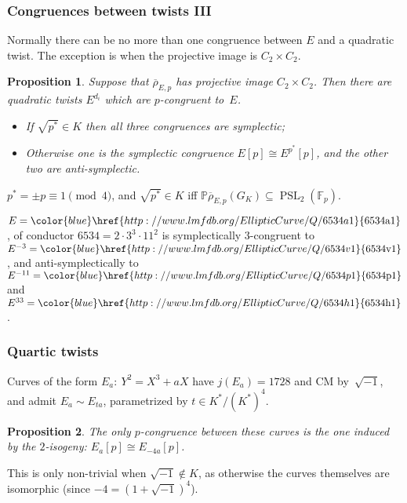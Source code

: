 \documentclass[compress]{beamer}
\newtheorem{prop}{Proposition}
\newcommand{\rhobar}{\overline{\rho}}
\newcommand{\F}{\mathbb F}
\newcommand{\PP}{\mathbb P}
\newcommand{\PSL}{\operatorname{PSL}}
\newcommand{\lmfdbec}[3]{\color{blue}\href{http://www.lmfdb.org/EllipticCurve/Q/#1#2#3}{{\text{\rm#1#2#3}}}}
\newcommand{\high}[1]{\emph{\color{blue}{#1}}}
\begin{document}
\begin{frame}\frametitle{Congruences between twists III}
  Normally there can be no more than one congruence between $E$ and a
  quadratic twist.  The exception is when the projective image is
  $C_2\times C_2$.

  \pause\medskip

  \begin{prop}
    Suppose that $\rhobar_{E,p}$ has projective image $C_2\times
    C_2$.  Then there are \high{three} quadratic twists $E^{d_i}$
    which are $p$-congruent to~$E$.
  \begin{itemize}
  \item If $\sqrt{p^*}\in K$ then all three congruences are symplectic;
    \item Otherwise one is the symplectic congruence $E[p]\cong
      E^{p^*}[p]$, and the other two are anti-symplectic.
  \end{itemize}
  \end{prop}
  $p^*=\pm p\equiv1\pmod4$, and $\sqrt{p^*}\in K$ iff
  $\PP\rhobar_{E,p}(G_K)\subseteq\PSL_2(\F_p)$.

  \pause\medskip

  \begin{example}
  $E=\lmfdbec{6534}{a}{1}$, of conductor $6534=2\cdot3^3\cdot11^2$ is
  symplectically $3$-congruent to $E^{-3}=\lmfdbec{6534}{v}{1}$, and
  anti-symplectically to $E^{-11}=\lmfdbec{6534}{p}{1}$ and
  $E^{33}=\lmfdbec{6534}{h}{1}$.
  \end{example}
  
\end{frame}

\begin{frame}\frametitle{Quartic twists}
  Curves of the form $E_a:\ Y^2=X^3+aX$ have $j(E_a)=1728$ and CM
  by~$\sqrt{-1}$, and admit \high{quartic twists} $E_a\sim E_{ta}$,
  parametrized by $t\in K^*/(K^*)^4$.

  \pause\medskip

  \begin{prop}
  The only $p$-congruence between these curves is the one induced by
  the $2$-isogeny: $E_a[p]\cong E_{-4a}[p]$.
  \end{prop}
  \pause\medskip

  This is only non-trivial when $\sqrt{-1}\notin K$, as otherwise the
  curves themselves are isomorphic (since $-4=(1+\sqrt{-1})^4$).

\end{frame}
\end{document}
